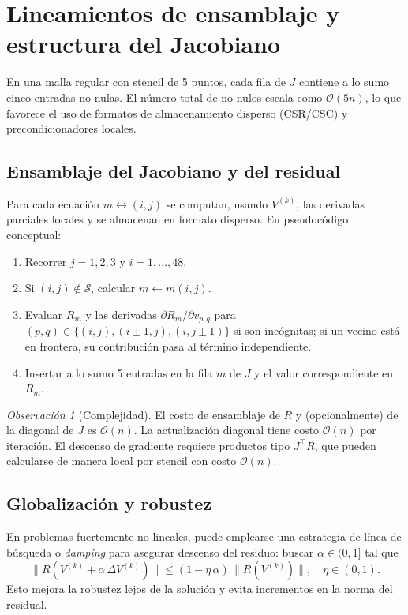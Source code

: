 \documentclass[12pt,letterpaper]{article}
\theoremstyle{definition}
\theoremstyle{remark}
\newtheorem{remark}{Observación}
\newcommand{\norm}[1]{\lVert #1\rVert}
\begin{document}
\section{Lineamientos de ensamblaje y estructura del Jacobiano}
En una malla regular con stencil de 5 puntos, cada fila de $J$ contiene a lo sumo cinco entradas no nulas. El número total de no nulos escala como $\mathcal{O}(5n)$, lo que favorece el uso de formatos de almacenamiento disperso (CSR/CSC) y precondicionadores locales.

\subsection{Ensamblaje del Jacobiano y del residual}
Para cada ecuación $m\leftrightarrow (i,j)$ se computan, usando $V^{(k)}$, las derivadas parciales locales y se almacenan en formato disperso. En pseudocódigo conceptual:
\begin{enumerate}[label=\alph*)]
  \item Recorrer $j=1,2,3$ y $i=1,\dots,48$.
  \item Si $(i,j)\notin \mathcal{S}$, calcular $m\leftarrow m(i,j)$.
  \item Evaluar $R_m$ y las derivadas $\partial R_m/\partial v_{p,q}$ para $(p,q)\in\{(i,j),(i\pm1,j),(i,j\pm1)\}$ si son incógnitas; si un vecino está en frontera, su contribución pasa al término independiente.
  \item Insertar a lo sumo 5 entradas en la fila $m$ de $J$ y el valor correspondiente en $R_m$.
\end{enumerate}

\begin{remark}[Complejidad]
El costo de ensamblaje de $R$ y (opcionalmente) de la diagonal de $J$ es $\mathcal{O}(n)$. La actualización diagonal tiene costo $\mathcal{O}(n)$ por iteración. El descenso de gradiente requiere productos tipo $J^\top R$, que pueden calcularse de manera local por stencil con costo $\mathcal{O}(n)$.
\end{remark}

\subsection{Globalización y robustez}
En problemas fuertemente no lineales, puede emplearse una estrategia de línea de búsqueda o \emph{damping} para asegurar descenso del residuo: buscar $\alpha\in(0,1]$ tal que
\[
  \norm{R\!\left(V^{(k)}+\alpha\,\Delta V^{(k)}\right)}\le (1-\eta\,\alpha)\,\norm{R\!\left(V^{(k)}\right)},\quad \eta\in(0,1).
\]
Esto mejora la robustez lejos de la solución y evita incrementos en la norma del residual.
\end{document}
